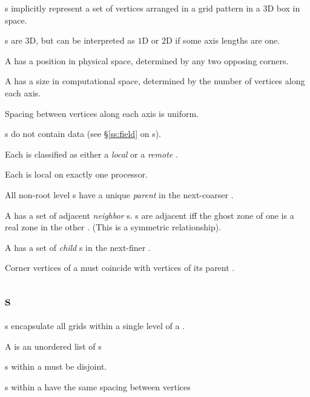 \documentclass[11pt]{article}
\begin{document}
s implicitly represent a set of vertices arranged in
a grid pattern in a $3$D box in space.

\BeginENUMERATE
\item {}s are $3$D, but can be interpreted as $1$D or $2$D if some axis lengths are one.
\item A  has a position in physical space, determined by any two opposing corners.
\item A  has a size in computational space, determined by the number of vertices along each axis.
\item Spacing between vertices along each axis is uniform.
\item {}s do not contain data (see \S\ref{ss:field} on s).
\item Each  is  classified as either a \textit{local}  or a \textit{remote} .
\item Each  is local on exactly one processor.
\item All non-root level s have a unique \textit{parent}  in
    the next-coarser .
\item A  has a set of adjacent \textit{neighbor} s.
  s are adjacent iff the ghost zone of one  is a real
    zone in the other . (This is a symmetric relationship).
\item A  has a set of \textit{child} s in
the next-finer .
\item Corner vertices of a  must coincide with
vertices of its parent .
\EndENUMERATE


\subsection{s} \label{ss:level}

s encapsulate all grids within a single level of a 
.

\BeginENUMERATE
\item A  is an unordered list of s
\item {}s within a  must be disjoint.
\item {}s within a  have the same spacing between vertices
\EndENUMERATE
\end{document}
